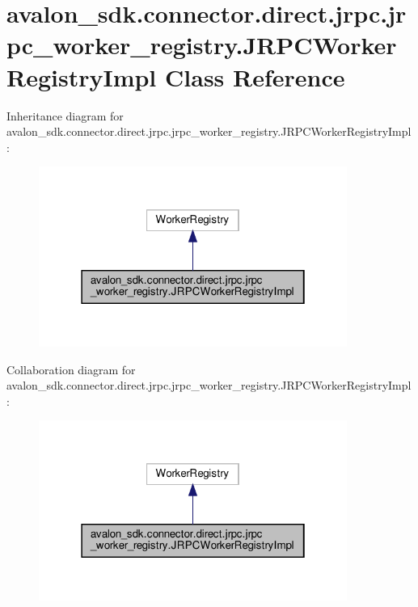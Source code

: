 \hypertarget{classavalon__sdk_1_1connector_1_1direct_1_1jrpc_1_1jrpc__worker__registry_1_1JRPCWorkerRegistryImpl}{}\section{avalon\+\_\+sdk.\+connector.\+direct.\+jrpc.\+jrpc\+\_\+worker\+\_\+registry.\+J\+R\+P\+C\+Worker\+Registry\+Impl Class Reference}
\label{classavalon__sdk_1_1connector_1_1direct_1_1jrpc_1_1jrpc__worker__registry_1_1JRPCWorkerRegistryImpl}


Inheritance diagram for avalon\+\_\+sdk.\+connector.\+direct.\+jrpc.\+jrpc\+\_\+worker\+\_\+registry.\+J\+R\+P\+C\+Worker\+Registry\+Impl\+:
\nopagebreak
\begin{figure}[H]
\begin{center}
\leavevmode
\includegraphics[width=286pt]{classavalon__sdk_1_1connector_1_1direct_1_1jrpc_1_1jrpc__worker__registry_1_1JRPCWorkerRegistryImpl__inherit__graph}
\end{center}
\end{figure}


Collaboration diagram for avalon\+\_\+sdk.\+connector.\+direct.\+jrpc.\+jrpc\+\_\+worker\+\_\+registry.\+J\+R\+P\+C\+Worker\+Registry\+Impl\+:
\nopagebreak
\begin{figure}[H]
\begin{center}
\leavevmode
\includegraphics[width=286pt]{classavalon__sdk_1_1connector_1_1direct_1_1jrpc_1_1jrpc__worker__registry_1_1JRPCWorkerRegistryImpl__coll__graph}
\end{center}
\end{figure}
